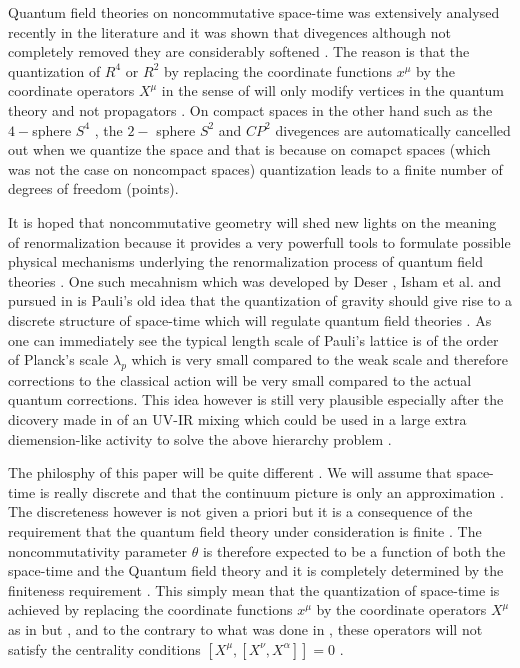 \documentclass[a4paper,12pt]{article}
\begin{document}
Quantum field theories on noncommutative space-time was
extensively analysed recently in the literature
\cite{seiberg,martin,krajewski,chep,ya,ben,mssw,hayakawa,adi,chms,cdp} and it
was shown that divegences although not completely removed they
are considerably softened . The reason is that the quantization
of $R^4$ or $R^2$ by replacing the coordinate functions $x^{\mu}$ by the
coordinate operators $X^{\mu}$ in the sense of \cite{dop} will
only modify vertices in the quantum theory and not propagators .
On compact spaces in the other hand such as the $4-$sphere $S^4$
\cite{hcp} , the $2-$ sphere $S^2$ \cite{hcp1} and $CP^2$
\cite{str} divegences are automatically cancelled out when we
quantize the space and that is because on comapct spaces (which was not the case on noncompact spaces) quantization leads to a finite number of degrees of freedom (points).

It is hoped that noncommutative geometry will shed new lights on
the meaning of renormalization because it provides a very
powerfull tools to formulate possible physical mechanisms
underlying the renormalization process of quantum field theories .
One such mecahnism which was developed by Deser \cite{deser} , Isham
et al.\cite{iss} and pursued in \cite{sorkin,madoregravity} is
Pauli's old idea that the quantization of gravity should give
rise to a discrete structure of space-time which will regulate
quantum field theories . As one can immediately see the typical
length scale of Pauli's lattice is of the order of Planck's scale
${\lambda}_p$ which is very small compared to the weak scale and
therefore corrections to the classical action will be very small
compared to the actual quantum corrections. This idea however is
still very plausible especially after the dicovery made in
\cite{seiberg} of an UV-IR mixing which could be used in a large
extra diemension-like activity to solve the above hierarchy
problem .

The philosphy of this paper will be quite different . We will
assume that space-time is really discrete and that the continuum
picture is only an approximation \cite{sorkin}. The discreteness however is
not given a priori but it is a consequence of the requirement that
the quantum field theory under consideration is finite . The
noncommutativity parameter ${\theta}$ is therefore expected to be
a function of both the space-time and the Quantum field theory
and it is completely determined by the finiteness requirement .
This simply mean that the quantization of space-time is achieved by
replacing the coordinate functions $x^{\mu}$ by the coordinate
operators $X^{\mu}$ as in \cite{snyder} but , and to the contrary to what was done in \cite{dop} , these operators will not satisfy the centrality
conditions $[X^{\mu},[X^{\nu},X^{\alpha}]]=0$ .
\end{document}
